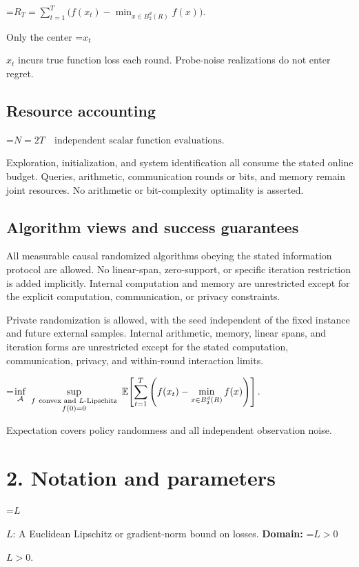\documentclass[10pt,a4paper]{article}
\newcommand{\AtlasMath}[1]{\par\begingroup\centering\setbox0=\hbox{$\displaystyle #1$}\ifdim\wd0>1.4\linewidth\typeout{ATLAS WIDE FORMULA: \the\wd0}\fi\ifdim\wd0>\linewidth\resizebox{\linewidth}{!}{\box0}\else\box0\fi\par\endgroup}
\newcommand{\AtlasInlineMath}[1]{\begingroup\setbox0=\hbox{$#1$}\ifdim\wd0>.4\linewidth\endgroup\AtlasMath{#1}\else\endgroup$#1$\fi}
\begin{document}
\AtlasMath{R_T=\sum_{t=1}^T\bigl(f(x_t)-\min_{x\in B_2^d(R)}f(x)\bigr).}


Only the center \AtlasInlineMath{x_t} incurs true function loss each round. Probe-noise realizations do not enter regret.

\subsection{Resource accounting}

\AtlasMath{N=2T\quad\text{independent scalar function evaluations}.}


Exploration, initialization, and system identification all consume the stated online budget. Queries, arithmetic, communication rounds or bits, and memory remain joint resources. No arithmetic or bit-complexity optimality is asserted.

\subsection{Algorithm views and success guarantees}
All measurable causal randomized algorithms obeying the stated information protocol are allowed. No linear-span, zero-support, or specific iteration restriction is added implicitly. Internal computation and memory are unrestricted except for the explicit computation, communication, or privacy constraints.

Private randomization is allowed, with the seed independent of the fixed instance and future external samples. Internal arithmetic, memory, linear spans, and iteration forms are unrestricted except for the stated computation, communication, privacy, and within-round interaction limits.


\AtlasMath{\inf_{\mathcal{A}}\ \sup_{\substack{f\ \text{\text{convex and} }L\text{-Lipschitz}\\f(0)=0}}\ \mathbb{E}\!\left[\sum_{t=1}^{T}\left(f(x_t)-\min_{x\in B_2^d(R)}f(x)\right)\right].}


Expectation covers policy randomness and all independent observation noise.

\section{2. Notation and parameters}
\AtlasInlineMath{L}: A Euclidean Lipschitz or gradient-norm bound on losses. \textbf{Domain:} \AtlasInlineMath{L>0}.
\end{document}
